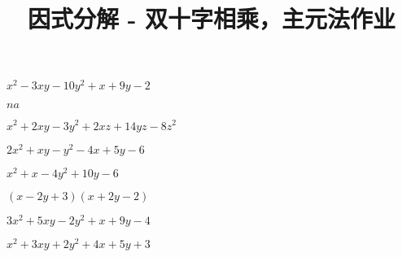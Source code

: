 \documentclass[windows,csize4]{BHCexam}
\title{因式分解 - 双十字相乘，主元法作业}
\begin{document}
\maketitle


\begin{groups}

    \begin{questions}[]

        \begin{multicols}{2}
            \question[5] $x^2-3xy-10y^2+x+9y-2$
            \begin{solution}{0.5cm}
                \methodonly $na$
            \end{solution}

            \question[5] $x^2+2xy-3y^2+2xz+14yz-8z^2$
            \begin{solution}{0.5cm}
                \methodonly
            \end{solution}
        \end{multicols}
        \vspace{3.5cm}

        \begin{multicols}{2}
            \question[5] $2x^2+xy-y^2-4x+5y-6$
            \begin{solution}{0.5cm}
                \methodonly
            \end{solution}

            \question[5] $x^2+x-4 y^2+10 y-6$
            \begin{solution}{0.5cm}
                \methodonly $(x-2 y+3) (x+2 y-2)$
            \end{solution}
        \end{multicols}
        \vspace{3.5cm}

        \begin{multicols}{2}
            \question[5] $3x^2+5xy-2y^2+x+9y-4$
            \begin{solution}{0.5cm}
                \methodonly
            \end{solution}

            \question[5] $x^2+3xy+2y^2+4x+5y+3$
            \begin{solution}{0.5cm}
                \methodonly
            \end{solution}
        \end{multicols}
        \vspace{3.5cm}
    \end{questions}


\end{groups}
\end{document}

